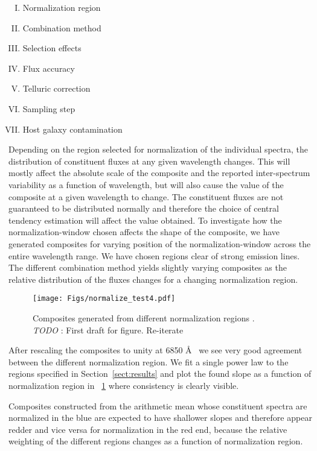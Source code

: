 \documentclass{aa}    %
\newcommand{\figref}[1]{\ref{fig:#1}}
\newcommand{\Fig}[1]{\figurename~\figref{#1}}
\newcommand{\fig}[1]{\Fig{#1}}
\newcommand{\figlabel}[1]{\label{fig:#1}}
\newcommand{\sectionname}{Section}
\newcommand{\Sect}[1]{\sectionname~\ref{sect:#1}}
\newcommand{\sect}[1]{\Sect{#1}}
\newcommand{\todo}[3]{{\color{#2}\emph{#1}: #3}}
\newcommand{\jstodo}[1]{\todo{ \\TODO }{green}{#1}}
\begin{document}
\begin{enumerate}[(I)]
	\item Normalization region
	\item Combination method
	\item Selection effects
	\item Flux accuracy
	\item Telluric correction
	\item Sampling step
	\item Host galaxy contamination
\end{enumerate}




Depending on the region selected for normalization of the individual spectra, the distribution of constituent fluxes at any given wavelength changes. This will mostly affect the absolute scale of the composite and the reported inter-spectrum variability as a function of wavelength, but will also cause the value of the composite at a given wavelength to change. The constituent fluxes are not guaranteed to be distributed normally and therefore the choice of central tendency estimation will affect the value obtained. To investigate how the normalization-window chosen affects the shape of the composite, we have generated composites for varying position of the normalization-window across the entire wavelength range. We have chosen regions clear of strong emission lines. The different combination method yields slightly varying composites as the relative distribution of the fluxes changes for a changing normalization region.

 \begin{figure}[hbtp]
   \centering
   \texttt{[image: Figs/normalize\_test4.pdf]}
   \caption[]{Composites generated from different normalization regions . \jstodo{First draft for figure. Re-iterate}}
  \figlabel{norm_test}
 \end{figure}


After rescaling the composites to unity at 6850 \AA~ we see very good agreement between the different normalization region. We fit a single power law to the regions specified in \sect{results} and plot the found slope as a function of normalization region in \fig{norm_test} where consistency is clearly visible. 

Composites constructed from the arithmetic mean whose constituent spectra are normalized in the blue are expected to have shallower slopes and therefore appear redder and vice versa for normalization in the red end, because the relative weighting of the different regions changes as a function of normalization region. 
\end{document}
